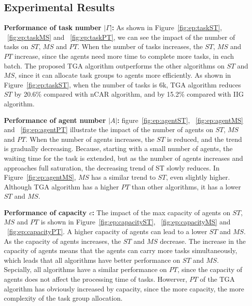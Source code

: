 \documentclass[sigconf,anonymous]{aamas}
\begin{document}
\subsection{Experimental Results}

\textbf{Performance of task number $|\Gamma|$:} As shown in Figure~\ref{fig:ep:taskST},
~\ref{fig:ep:taskMS} and ~\ref{fig:ep:taskPT},
we can see the impact of the number of tasks on $ST$, $MS$ and $PT$.
When the number of tasks increases,
the $ST$, $MS$ and $PT$ increase,
since the agents need more time to complete more tasks, in each batch.
The proposed TGA algorithm outperforms the other algorithms on $ST$ and $MS$,
since it can allocate task groups to agents more efficiently.
As shown in Figure~\ref{fig:ep:taskST},
when the number of tasks is 6k,
TGA algorithm reduces $ST$ by 20.6\% compared with nCAR algorithm,
and by 15.2\% compared with IIG algorithm.
 
\textbf{Performance of agent number $|A|$:}
figure~\ref{fig:ep:agentST}, ~\ref{fig:ep:agentMS} and ~\ref{fig:ep:agentPT}
illustrate the impact of the number of agents on $ST$, $MS$ and $PT$.
When the number of agents increases,
the $ST$ is reduced, and the trend is gradually decreasing.
Because, starting with a small number of agents, 
the waiting time for the task is extended, 
but as the number of agents increases and approaches full saturation, 
the decreasing trend of ST slowly reduces.
In Figure~\ref{fig:ep:agentMS},
$MS$ has a similar trend to $ST$, even slightly higher.
Although TGA algorithm has a higher $PT$ than other algorithms,
it has a lower $ST$ and $MS$.

\textbf{Performance of capacity $c$:}
The impact of the max capacity of agents on $ST$, $MS$ and $PT$ is shown 
in Figure~\ref{fig:ep:capacityST}, ~\ref{fig:ep:capacityMS} and ~\ref{fig:ep:capacityPT}.
A higher capacity of agents can lead to a lower $ST$ and $MS$.
As the capacity of agents increases, the $ST$ and $MS$ decrease.
The increase in the capacity of agents means
that the agents can carry more tasks simultaneously,
which leads that all algorithms have better performance on $ST$ and $MS$.
Sepcially, all algorithms have a similar performance on $PT$,
since the capacity of agents does not affect the processing time of tasks.
Howerver, $PT$ of the TGA algorithm has obviously increased by capacity,
since the more capacity, the more complexity of the task group allocation.


\end{document}

